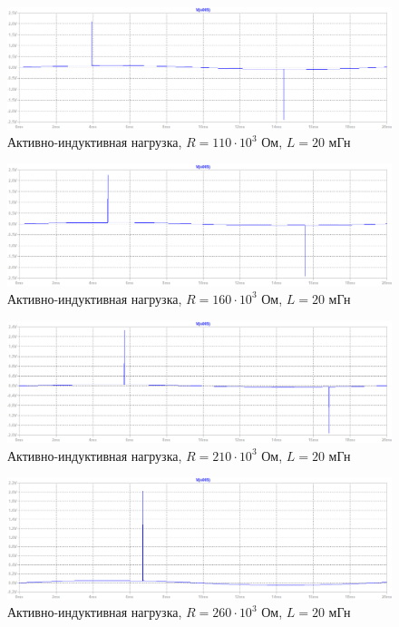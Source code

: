 \documentclass[a4paper, 12pt]{article}
\begin{document}
    \begin{figure}[H]
        \centering
        \includegraphics[scale=0.45]{R2-110k_L20m.png}
        \captionsetup{skip=0pt}
        \caption{Активно-индуктивная нагрузка, $R=110\cdot10^3$ Ом, $L=20$ мГн}
        \label{fig:R2-110k_L20m}
    \end{figure}
    \begin{figure}[H]
        \centering
        \includegraphics[scale=0.45]{R2-160k_L20m.png}
        \captionsetup{skip=0pt}
        \caption{Активно-индуктивная нагрузка, $R=160\cdot10^3$ Ом, $L=20$ мГн}
        \label{fig:R2-160k_L20m}
    \end{figure}
    \begin{figure}[H]
        \centering
        \includegraphics[scale=0.45]{R2-210k_L20m.png}
        \captionsetup{skip=0pt}
        \caption{Активно-индуктивная нагрузка, $R=210\cdot10^3$ Ом, $L=20$ мГн}
        \label{fig:R2-210k_L20m}
    \end{figure}
    \begin{figure}[H]
        \centering
        \includegraphics[scale=0.45]{R2-260k_L20m.png}
        \captionsetup{skip=0pt}
        \caption{Активно-индуктивная нагрузка, $R=260\cdot10^3$ Ом, $L=20$ мГн}
        \label{fig:R2-260k_L20m}
    \end{figure}
\end{document}
